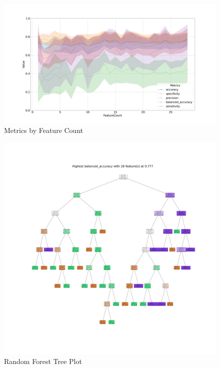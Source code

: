 \documentclass{beamer}
\begin{document}
\begin{frame}[allowframebreaks]
        \begin{figure}
            \includegraphics[width=0.8 \linewidth]{figures/RandomForest/two.Deblur.homd/metrics.png}
            \caption{Metrics by Feature Count}
        \end{figure}

        \begin{figure}
            \includegraphics[width=0.5 \linewidth]{figures/RandomForest/two.Deblur.homd/highest_balanced_accuracy.png}
            \caption{Random Forest Tree Plot}
        \end{figure}


\end{frame}
\end{document}
